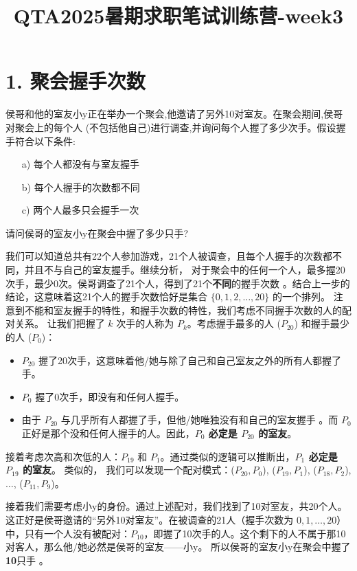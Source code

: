 \documentclass[UTF8]{ctexart}
\title{QTA2025暑期求职笔试训练营-week3}
\author{}
\date{}
\begin{document}
\maketitle
\section*{1. 聚会握手次数}

侯哥和他的室友小y正在举办一个聚会,他邀请了另外10对室友。在聚会期间,侯哥对聚会上的每个人 (不包括他自己)进行调查,并询问每个人握了多少次手。假设握手符合以下条件:
\begin{itemize}
    \item[a)] 每个人都没有与室友握手
    \item[b)] 每个人握手的次数都不同
    \item[c)] 两个人最多只会握手一次
\end{itemize}
请问侯哥的室友小y在聚会中握了多少只手?


我们可以知道总共有22个人参加游戏，21个人被调查，且每个人握手的次数都不同，并且不与自己的室友握手。继续分析，
对于聚会中的任何一个人，最多握20次手，最少0次。侯哥调查了21个人，得到了21个\textbf{不同}的握手次数 。结合上一步的结论，这意味着这21个人的握手次数恰好是集合 $\{0, 1, 2, \dots, 20\}$ 的一个排列。
注意到不能和室友握手的特性，和握手次数的特性，我们考虑不同握手次数的人的配对关系。
让我们把握了 $k$ 次手的人称为 $P_k$。考虑握手最多的人 ($P_{20}$) 和握手最少的人 ($P_0$)：
\begin{itemize}
            \item $P_{20}$ 握了20次手，这意味着他/她与除了自己和自己室友之外的所有人都握了手。
            \item $P_0$ 握了0次手，即没有和任何人握手。
            \item 由于 $P_{20}$ 与几乎所有人都握了手，但他/她唯独没有和自己的室友握手 。而 $P_0$ 正好是那个没和任何人握手的人。因此，\textbf{$P_0$ 必定是 $P_{20}$ 的室友}。
\end{itemize}

接着考虑次高和次低的人：$P_{19}$ 和 $P_1$。通过类似的逻辑可以推断出，\textbf{$P_1$ 必定是 $P_{19}$ 的室友}。
类似的， 我们可以发现一个配对模式：($P_{20}, P_0$), ($P_{19}, P_1$), ($P_{18}, P_2$), $\dots$, ($P_{11}, P_9$)。


接着我们需要考虑小y的身份。通过上述配对，我们找到了10对室友，共20个人。这正好是侯哥邀请的“另外10对室友”。在被调查的21人（握手次数为 $0, 1, \dots, 20$）中，只有一个人没有被配对：$P_{10}$，即握了10次手的人。这个剩下的人不属于那10对客人，那么他/她必然是侯哥的室友——小y。
所以侯哥的室友小y在聚会中握了\textbf{10}只手 。
\end{document}
